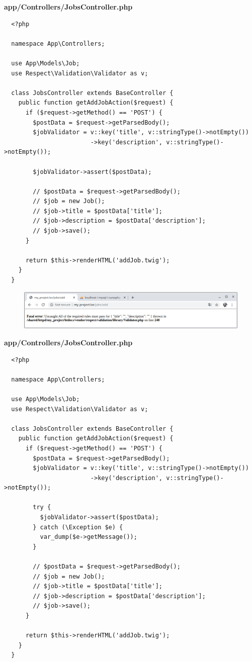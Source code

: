 \documentclass{article}
\begin{document}
\newpage

\textbf{app/Controllers/JobsController.php}
\begin{verbatim}
  <?php

  namespace App\Controllers;

  use App\Models\Job;
  use Respect\Validation\Validator as v;

  class JobsController extends BaseController {
    public function getAddJobAction($request) {
      if ($request->getMethod() == 'POST') {
        $postData = $request->getParsedBody();
        $jobValidator = v::key('title', v::stringType()->notEmpty())
                        ->key('description', v::stringType()->notEmpty());

        $jobValidator->assert($postData);

        // $postData = $request->getParsedBody();
        // $job = new Job();
        // $job->title = $postData['title'];
        // $job->description = $postData['description'];
        // $job->save();
      }

      return $this->renderHTML('addJob.twig');
    }
  }
\end{verbatim}

\begin{figure}[h!]
  \centering
  \includegraphics[scale=0.5]{./Pictures/166_fatal_erro_assert.png}
\end{figure}

\textbf{app/Controllers/JobsController.php}
\begin{verbatim}
  <?php

  namespace App\Controllers;

  use App\Models\Job;
  use Respect\Validation\Validator as v;

  class JobsController extends BaseController {
    public function getAddJobAction($request) {
      if ($request->getMethod() == 'POST') {
        $postData = $request->getParsedBody();
        $jobValidator = v::key('title', v::stringType()->notEmpty())
                        ->key('description', v::stringType()->notEmpty());

        try {
          $jobValidator->assert($postData);
        } catch (\Exception $e) {
          var_dump($e->getMessage());
        }

        // $postData = $request->getParsedBody();
        // $job = new Job();
        // $job->title = $postData['title'];
        // $job->description = $postData['description'];
        // $job->save();
      }

      return $this->renderHTML('addJob.twig');
    }
  }
\end{verbatim}
\end{document}
